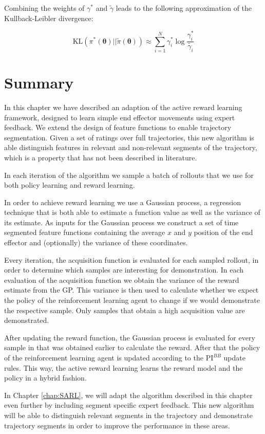 \documentclass[mscThesis.tex]{subfiles}
\begin{document}
Combining the weights of $\gamma^*$ and $\tilde{\gamma}$ leads to the following approximation of the Kullback-Leibler divergence:  

\begin{equation*}
    \text{KL}(\pi^* (\bm{\theta})||\tilde{\pi} (\bm{\theta})) \approx \sum_{i=1}^N \gamma^*_i \log \frac{\gamma^*_i}{\tilde{\gamma_i}}
\end{equation*}

\section{Summary}


In this chapter we have described an adaption of the active reward learning framework, designed to learn simple end effector movements using expert feedback. We extend the design of feature functions to enable trajectory segmentation. Given a set of ratings over full trajectories, this new algorithm is able distinguish features in relevant and non-relevant segments of the trajectory, which is a property that has not been described in literature.

In each iteration of the algorithm we sample a batch of rollouts that we use for both policy learning and reward learning. 

In order to achieve reward learning we use a Gaussian process, a regression technique that is both able to estimate a function value as well as the variance of its estimate. As inputs for the Gaussian process we construct a set of time segmented feature functions containing the average $x$ and $y$ position of the end effector and (optionally) the variance of these coordinates. 

Every iteration, the acquisition function is evaluated for each sampled rollout, in order to determine which samples are interesting for demonstration. In each evaluation of the acquisition function we obtain the variance of the reward estimate from the GP. This variance is then used to calculate whether we expect the policy of the reinforcement learning agent to change if we would demonstrate the respective sample. Only samples that obtain a high acquisition value are demonstrated.

After updating the reward function, the Gaussian process is evaluated for every sample in that was obtained earlier to calculate the reward. After that the policy of the reinforcement learning agent is updated according to the $\text{PI}^{BB}$ update rules. This way, the active reward learning learns the reward model and the policy in a hybrid fashion.

 In Chapter \ref{chap:SARL}, we will adapt the algorithm described in this chapter even further by including segment specific expert feedback. This new algorithm will be able to distinguish relevant segments in the trajectory and demonstrate trajectory segments in order to improve the performance in these areas. 

%
\end{document}

